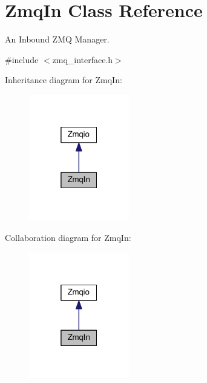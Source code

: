\hypertarget{classZmqIn}{}\section{Zmq\+In Class Reference}
\label{classZmqIn}


An Inbound Z\+MQ Manager.  




{\ttfamily \#include $<$zmq\+\_\+interface.\+h$>$}



Inheritance diagram for Zmq\+In\+:
\nopagebreak
\begin{figure}[H]
\begin{center}
\leavevmode
\includegraphics[width=124pt]{classZmqIn__inherit__graph}
\end{center}
\end{figure}


Collaboration diagram for Zmq\+In\+:
\nopagebreak
\begin{figure}[H]
\begin{center}
\leavevmode
\includegraphics[width=124pt]{classZmqIn__coll__graph}
\end{center}
\end{figure}
